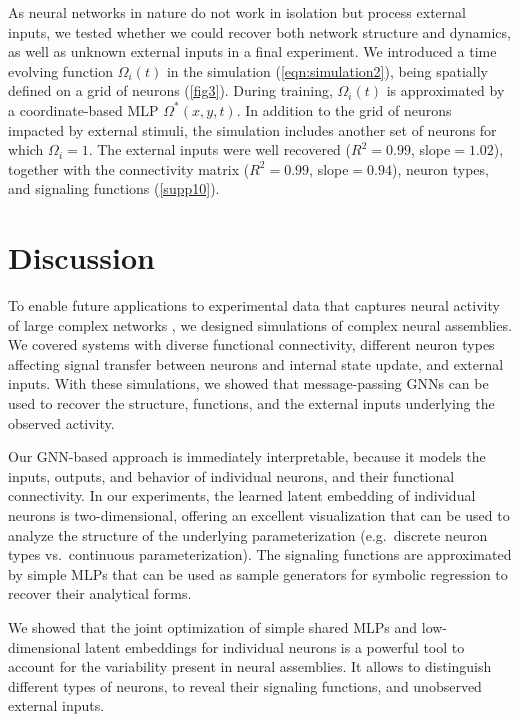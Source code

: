 \documentclass[10pt,twocolumn]{article}
\begin{document}
As neural networks in nature do not work in isolation but process external inputs, we tested whether we could recover both network structure and dynamics, as well as unknown external inputs in a final experiment.  We introduced a time evolving function $\Omega_i(t)$ in the simulation (\cref{eqn:simulation2}), being spatially defined on a grid of  neurons (\cref{fig3}).  During training, $\Omega_i(t)$ is approximated by a coordinate-based MLP $\Omega^*(x, y, t)$.  In addition to the grid of  neurons impacted by external stimuli, the simulation includes another set of  neurons for which $\Omega_i=1$. The external inputs were well recovered ($R^2=0.99$, slope$=1.02$), together with the connectivity matrix ($R^2=0.99$, slope$=0.94$), neuron types, and signaling functions (\cref{supp10}).

\section{Discussion}

To enable future applications to experimental data that captures neural activity of large complex networks \citep{lueckmann_zapbench_2025}, we designed simulations of complex neural assemblies.  We covered systems with diverse functional connectivity, different neuron types affecting signal transfer between neurons and internal state update, and external inputs.  With these simulations, we showed that message-passing GNNs can be used to recover the structure, functions, and the external inputs underlying the observed activity.

Our GNN-based approach is immediately interpretable, because it models the inputs, outputs, and behavior of individual neurons, and their functional connectivity.  In our experiments, the learned latent embedding of individual neurons is two-dimensional, offering an excellent visualization that can be used to analyze the structure of the underlying parameterization (e.g.\ discrete neuron types vs.\ continuous parameterization).  The signaling functions are approximated by simple MLPs that can be used as sample generators for symbolic regression to recover their analytical forms.

We showed that the joint optimization of simple shared MLPs and low-dimensional latent embeddings for individual neurons is a powerful tool to account for the variability present in neural assemblies.  It allows to distinguish different types of neurons, to reveal their signaling functions, and unobserved external inputs.
\end{document}
